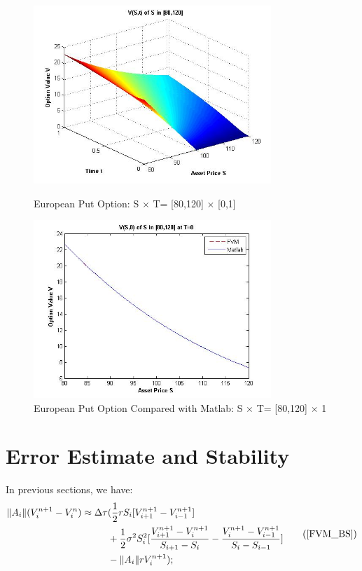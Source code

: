 \documentclass[final]{siamltex}
\begin{document}
\begin{figure}[H]
	\centering
	\includegraphics[width=0.8\textwidth]{European_put_main}
	\caption{European Put Option: S $\times $ T= [80,120] $\times $ [0,1]}
	\includegraphics[width=0.8\textwidth]{European_put_Final20}
	\caption{European Put Option Compared with Matlab: S $\times $ T= [80,120] $\times $ {1}}
	\label{European_put_main}	
\end{figure}

\section{Error Estimate and Stability}
In previous sections, we have:
\begin{equation}
\begin{split}
\|A_i\|(V_i^{n+1}- V_i^{n}) \approx  \Delta \tau &(\frac{1}{2}rS_i[V^{n+1}_{i+1}-V^{n+1}_{i-1}]\\
& +\frac{1}{2} \sigma ^2 S_i^2 [\frac{V^{n+1}_{i+1}-V^{n+1}_i}{S_{i+1}-S_i} 
- \frac{V^{n+1}_{i}-V^{n+1}_{i-1}}{S_{i}-S_{i-1}}] \\
& - \|A_i\| rV_i^{n+1});
\end{split}
\tag{\ref{FVM_BS}}
\end{equation}
\end{document}
